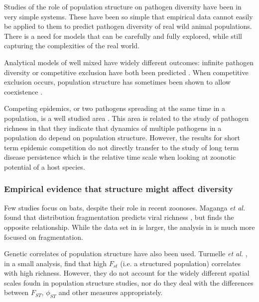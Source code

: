 
Studies of the role of population structure on pathogen diversity have been in very simple systems.
These have been so simple that empirical data cannot easily be applied to them to predict pathogen diversity of real wild animal populations.
There is a need for models that can be carefully and fully explored, while still capturing the complexities of the real world.

Analytical models of well mixed have widely different outcomes: infinite pathogen diversity \cite{may1994superinfection, ackleh2014robust} or competitive exclusion have both been predicted \cite{ackleh2003competitive,bremermann1989competitive,martcheva2013competitive,qiu2013vector,allen2004sis}.
When competitive exclusion occurs, population structure has sometimes been shown to allow coexistence \cite{qiu2013vector,allen2004sis, nunes2006localized}.

Competing epidemics, or two pathogens spreading at the same time in a population, is a well studied area \cite{poletto2013host, poletto2015characterising, karrer2011competing}. 
This area is related to the study of pathogen richness in that they indicate that dynamics of multiple pathogens in a population do depend on population structure.
However, the results for short term epidemic competition do not directly transfer to the study of long term disease persistence which is the relative time scale when looking at zoonotic potential of a host species.




\subsubsection{Empirical evidence that structure might affect diversity}




Few studies focus on bats, despite their role in recent zoonoses.
Maganga \emph{et al.} found that distribution fragmentation predicts viral richness \cite{maganga2014bat}, but \cite{gay2014parasite} finds the opposite relationship. 
While the data set in \cite{gay2014parasite} is larger, the analysis in \cite{maganga2014bat} is much more focused on fragmentation.

Genetic correlates of population structure have also been used.
Turmelle \emph{et al.} \cite{turmelle2009correlates}, in a small analysis, find that high $F_{st}$ (i.e. a structured population) correlates with high richness.
However, they do not account for the widely different spatial scales foudn in population structure studies, nor do they deal with the differences between $F_{ST}$, $\phi_{ST}$ and other measures appropriately. 



